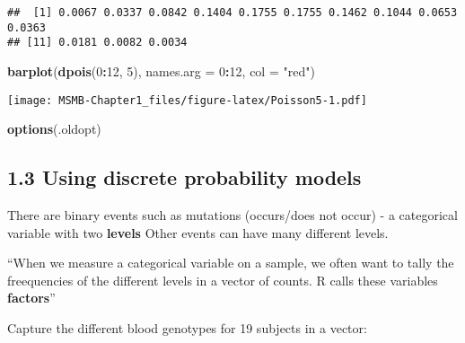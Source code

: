 \documentclass[]{article}
\newenvironment{Shaded}{\begin{snugshade}}{\end{snugshade}}
\newcommand{\KeywordTok}[1]{\textcolor[rgb]{0.13,0.29,0.53}{\textbf{#1}}}
\newcommand{\DataTypeTok}[1]{\textcolor[rgb]{0.13,0.29,0.53}{#1}}
\newcommand{\DecValTok}[1]{\textcolor[rgb]{0.00,0.00,0.81}{#1}}
\newcommand{\StringTok}[1]{\textcolor[rgb]{0.31,0.60,0.02}{#1}}
\newcommand{\OperatorTok}[1]{\textcolor[rgb]{0.81,0.36,0.00}{\textbf{#1}}}
\newcommand{\NormalTok}[1]{#1}
\let\origfigure\figure
\let\endorigfigure\endfigure
\renewenvironment{figure}[1][2] {
    \expandafter\origfigure\expandafter[H]
} {
    \endorigfigure
}
\begin{document}
\begin{verbatim}
##  [1] 0.0067 0.0337 0.0842 0.1404 0.1755 0.1755 0.1462 0.1044 0.0653 0.0363
## [11] 0.0181 0.0082 0.0034
\end{verbatim}

\begin{Shaded}
\begin{Highlighting}[]
\KeywordTok{barplot}\NormalTok{(}\KeywordTok{dpois}\NormalTok{(}\DecValTok{0}\OperatorTok{:}\DecValTok{12}\NormalTok{, }\DecValTok{5}\NormalTok{), }\DataTypeTok{names.arg =} \DecValTok{0}\OperatorTok{:}\DecValTok{12}\NormalTok{, }\DataTypeTok{col =} \StringTok{"red"}\NormalTok{)}
\end{Highlighting}
\end{Shaded}

\begin{figure}
\centering
\texttt{[image: MSMB-Chapter1\_files/figure-latex/Poisson5-1.pdf]}
\caption{Probabilities of seeing 0,1,2,\ldots{},12 mutations, as modeled
by the Poisson(5) distribution. The plot shows that we will often see 4
or 5 mutations but rarely as many as 12. The distribution continues to
higher numbers (\(13,...\)), but the probabilities will be successively
smaller, and here we don't visualize them.}
\end{figure}

\begin{Shaded}
\begin{Highlighting}[]
\KeywordTok{options}\NormalTok{(.oldopt)}
\end{Highlighting}
\end{Shaded}

\subsection{1.3 Using discrete probability
models}\label{using-discrete-probability-models}

There are binary events such as mutations (occurs/does not occur) - a
categorical variable with two \textbf{levels} Other events can have many
different levels.

``When we measure a categorical variable on a sample, we often want to
tally the freequencies of the different levels in a vector of counts. R
calls these variables \textbf{factors}''

Capture the different blood genotypes for 19 subjects in a vector:
\end{document}

